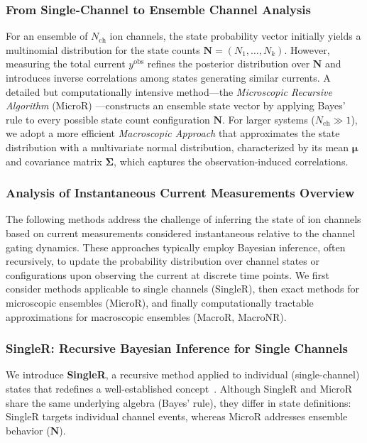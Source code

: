 \documentclass[pdflatex,sn-nature]{sn-jnl}%
\begin{document}
\subsubsection{From Single-Channel to Ensemble Channel Analysis}
\label{sec:single_to_ensemble}
For an ensemble of \(N_{\text{ch}}\) ion channels, the state probability vector initially yields a multinomial distribution for the state counts \(\boldsymbol{N} = (N_1, \dots, N_k)\). However, measuring the total current \(y^{\text{obs}}\) refines the posterior distribution over \(\boldsymbol{N}\) and introduces inverse correlations among states generating similar currents. A detailed but computationally intensive method—the \textit{Microscopic Recursive Algorithm} (MicroR) \cite{Moffatt}—constructs an ensemble state vector by applying Bayes’ rule to every possible state count configuration \(\boldsymbol{N}\). For larger systems (\(N_{\text{ch}} \gg 1\)), we adopt a more efficient \textit{Macroscopic Approach} that approximates the state distribution with a multivariate normal distribution, characterized by its mean \(\boldsymbol{\mu}\) and covariance matrix \(\boldsymbol{\Sigma}\), which captures the observation-induced correlations.

\subsubsection{Analysis of Instantaneous Current Measurements Overview}
\label{sec:instantaneous_overview}
The following methods address the challenge of inferring the state of ion channels based on current measurements considered instantaneous relative to the channel gating dynamics. These approaches typically employ Bayesian inference, often recursively, to update the probability distribution over channel states or configurations upon observing the current at discrete time points. We first consider methods applicable to single channels (SingleR), then exact methods for microscopic ensembles (MicroR), and finally computationally tractable approximations for macroscopic ensembles (MacroR, MacroNR).

\subsubsection{SingleR: Recursive Bayesian Inference for Single Channels}
\label{sec:singler}
We introduce \textbf{SingleR}, a recursive method applied to individual (single-channel) states that redefines a well-established concept~\cite{Qin}. Although SingleR and MicroR share the same underlying algebra (Bayes' rule), they differ in state definitions: SingleR targets individual channel events, whereas MicroR addresses ensemble behavior (\(\boldsymbol{N}\)).
\end{document}

